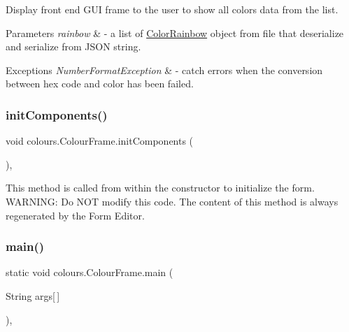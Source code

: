 Display front end G\+UI frame to the user to show all colors data from the list. 
\begin{DoxyParams}{Parameters}
{\em rainbow} & -\/ a list of \hyperlink{classcolours_1_1_color_rainbow}{Color\+Rainbow} object from file that deserialize and serialize from J\+S\+ON string. \\
\hline
\end{DoxyParams}

\begin{DoxyExceptions}{Exceptions}
{\em Number\+Format\+Exception} & -\/ catch errors when the conversion between hex code and color has been failed. \\
\hline
\end{DoxyExceptions}
\mbox{\label{classcolours_1_1_colour_frame_aa654076ec5e365557e85b7ba8e3dae47}} 
\subsubsection{\texorpdfstring{init\+Components()}{initComponents()}}
{\footnotesize\ttfamily void colours.\+Colour\+Frame.\+init\+Components (\begin{DoxyParamCaption}{ }\end{DoxyParamCaption})\hspace{0.3cm}{\ttfamily [inline]}, {\ttfamily [private]}}

This method is called from within the constructor to initialize the form. W\+A\+R\+N\+I\+NG\+: Do N\+OT modify this code. The content of this method is always regenerated by the Form Editor. \mbox{\label{classcolours_1_1_colour_frame_a7f890970aa168fcb9791f1de589a5c2c}} 
\subsubsection{\texorpdfstring{main()}{main()}}
{\footnotesize\ttfamily static void colours.\+Colour\+Frame.\+main (\begin{DoxyParamCaption}\item[{String}]{args\mbox{[}$\,$\mbox{]} }\end{DoxyParamCaption})\hspace{0.3cm}{\ttfamily [inline]}, {\ttfamily [static]}}


